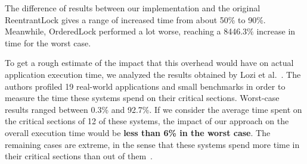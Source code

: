 The difference of results between our implementation and the original ReentrantLock gives a range of increased time from about 50\% to 90\%. Meanwhile, OrderedLock performed a lot worse, reaching a 8446.3\% increase in time for the worst case. 

To get a rough estimate of the impact that this overhead would have on actual application execution time, we analyzed the results obtained by Lozi et al.~\cite{lozi}. The authors profiled 19 real-world applications and small benchmarks in order to measure the time these systems spend on their critical sections. Worst-case results ranged between 0.3\% and 92.7\%. If we consider the average time spent on the critical sections of 12 of these systems, the impact of our approach on the overall execution time would be \textbf{less than 6\% in the worst case}. The remaining cases are extreme, in the sense that these systems spend more time in their critical sections than out of them~\cite{lozi}. 


